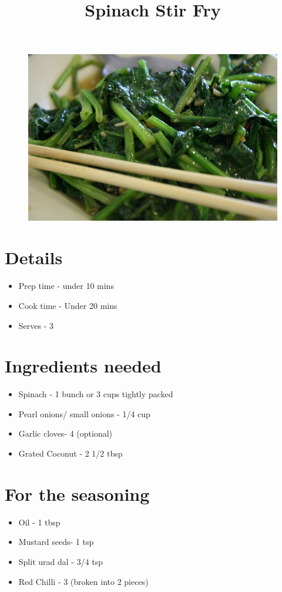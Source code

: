\documentclass[12pt,a4paper]{article}
\title{Spinach Stir Fry}
\author{}
\date{}
\begin{document}
\maketitle

\begin{figure}[t]
    \centering
    \includegraphics[scale=0.5]{stirfryspinach.jpg}
\end{figure}
\section*{Details}
\begin{itemize}
    \item Prep time - under 10 mins
    \item Cook time - Under 20 mins
    \item Serves - 3
\end{itemize}


\section*{Ingredients needed}
\begin{itemize}
    \item Spinach - 1 bunch or 3 cups tightly packed 
    \item Pearl onions/ small onions - 1/4 cup
    \item Garlic cloves- 4 (optional)
    \item Grated Coconut - 2 1/2 tbsp
\end{itemize}

\section*{For the seasoning}
\begin{itemize}
    \item Oil - 1 tbsp
    \item Mustard seeds- 1 tsp
    \item Split urad dal - 3/4 tsp
    \item Red Chilli - 3 (broken into 2 pieces)
\end{itemize}
\end{document}
